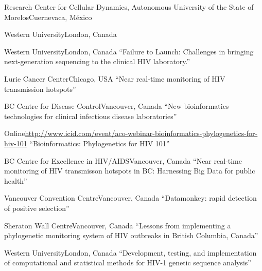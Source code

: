 \documentclass[11pt]{moderncv}
\begin{document}
{Research Center for Cellular Dynamics, Autonomous University of the State of Morelos}{Cuernevaca, M\'exico}{}

{Western University}{London, Canada}
{}

{Western University}{London, Canada}
{``Failure to Launch: Challenges in bringing next-generation sequencing to the clinical HIV laboratory.''}

{}

{Lurie Cancer Center}{Chicago, USA}
{``Near real-time monitoring of HIV transmission hotspots''}

{BC Centre for Disease Control}{Vancouver, Canada}
{``New bioinformatics technologies for clinical infectious disease laboratories''}

{Online}{\url{http://www.icid.com/event/aco-webinar-bioinformatics-phylogenetics-for-hiv-101}}
{``Bioinformatics: Phylogenetics for HIV 101''}

{BC Centre for Excellence in HIV/AIDS}{Vancouver, Canada}
{``Near real-time monitoring of HIV transmisson hotspots in BC: Harnessing Big Data for public health''}

{Vancouver Convention Centre}{Vancouver, Canada}
{``Datamonkey: rapid detection of positive selection''}

{Sheraton Wall Centre}{Vancouver, Canada}
{``Lessons from implementing a phylogenetic monitoring system of HIV outbreaks in British Columbia, Canada''}

{Western University}{London, Canada}
{``Development, testing, and implementation of computational and statistical methods for HIV-1 genetic sequence analysis''}
\end{document}
